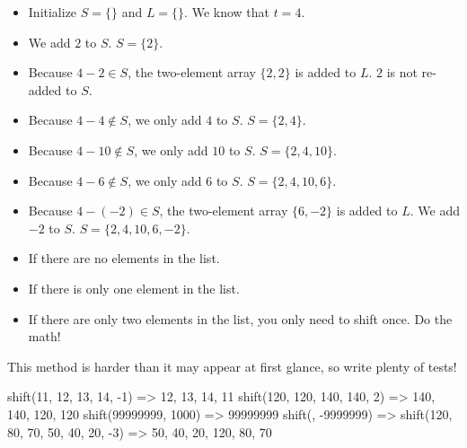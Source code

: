 \begin{itemize}
    \item Initialize $S=\{\}$ and $L=\{\}$. We know that $t=4$.
    \item We add $2$ to $S$. $S=\{2\}$.
    \item Because $4-2\in{S}$, the two-element array $\{2, 2\}$ is added to $L$. $2$ is not re-added to $S$.
    \item Because $4-4\not\in{S}$, we only add $4$ to $S$. $S=\{2, 4\}$.
    \item Because $4-10\not\in{S}$, we only add $10$ to $S$. $S=\{2, 4, 10\}$.
    \item Because $4-6\not\in{S}$, we only add $6$ to $S$. $S=\{2, 4, 10, 6\}$.
    \item Because $4-(-2)\in{S}$, the two-element array $\{6, -2\}$ is added to $L$. We add $-2$ to $S$. $S=\{2, 4, 10, 6, -2\}$.
\end{itemize}

\begin{itemize}
    \item If there are no elements in the list.
    \item If there is only one element in the list.
    \item If there are only two elements in the list, you only need to shift once. Do the math!
\end{itemize}
    
This method is harder than it may appear at first glance, so write plenty of tests!

\begin{verbnobox}[\small]
shift({11, 12, 13, 14}, -1)          => {12, 13, 14, 11}
shift({120, 120, 140, 140}, 2)       => {140, 140, 120, 120}
shift({99999999}, 1000)              => {99999999}
shift({}, -9999999)                  => {}
shift({120, 80, 70, 50, 40, 20}, -3) => {50, 40, 20, 120, 80, 70}
\end{verbnobox}


